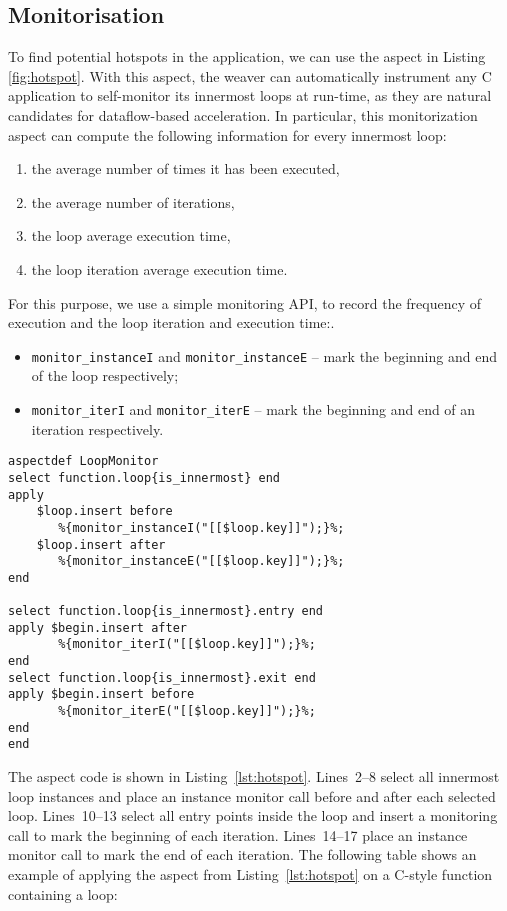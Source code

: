 \subsection{Monitorisation}
\label{sect:asp_mon}
To find potential hotspots in the application, we can use the aspect
in Listing \ref{fig:hotspot}.  With this aspect, the weaver can
automatically instrument any C application to self-monitor its
innermost loops at run-time, as they are natural candidates for
dataflow-based acceleration. In particular, this monitorization aspect
can compute the following information for every innermost loop:
\begin{enumerate}
\item the average number of times it has been executed,
\item the average number of iterations,
\item the loop average execution time,
\item the loop iteration average execution time.
\end{enumerate}

For this purpose, we use a simple monitoring API, to record the
frequency of execution and the loop iteration and execution time:.
\begin{itemize}
\item \texttt{monitor\_instanceI} and \texttt{monitor\_instanceE} -- mark
  the beginning and end of the loop respectively;
\item \texttt{monitor\_iterI} and \texttt{monitor\_iterE} -- mark the
  beginning and end of an iteration respectively.
\end{itemize}

\lstset{style=lara}
\begin{lstlisting}[caption={Aspect that instruments the application to monitor loop
  activity. The information generated can be used to identify
  hotspots.}, label={lst:hotspot}]
aspectdef LoopMonitor
select function.loop{is_innermost} end
apply
    $loop.insert before
       %{monitor_instanceI("[[$loop.key]]");}%;
    $loop.insert after
       %{monitor_instanceE("[[$loop.key]]");}%;
end

select function.loop{is_innermost}.entry end
apply $begin.insert after
       %{monitor_iterI("[[$loop.key]]");}%;
end
select function.loop{is_innermost}.exit end
apply $begin.insert before
       %{monitor_iterE("[[$loop.key]]");}%;
end
end
\end{lstlisting}

The aspect code is shown in Listing~\ref{lst:hotspot}. Lines~2--8 select
all innermost loop instances and place an instance monitor call before
and after each selected loop. Lines~10--13 select all entry points
inside the loop and insert a monitoring call to mark the beginning of
each iteration. Lines~14--17 place an instance monitor call to mark
the end of each iteration. The following table shows an example of
applying the aspect from Listing~\ref{lst:hotspot} on a C-style function
containing a loop:

